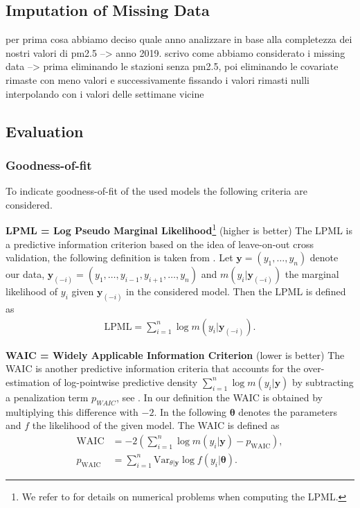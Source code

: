 \documentclass[12pt,a4paper]{article}
\begin{document}
\subsection{Imputation of Missing Data}
per prima cosa abbiamo deciso quale anno analizzare in base alla completezza dei nostri valori di pm2.5 --> anno 2019. 
scrivo come abbiamo considerato i missing data --> prima eliminando le stazioni senza pm2.5, poi eliminando le covariate rimaste con meno valori e successivamente fissando i valori rimasti nulli interpolando con i valori delle settimane vicine 

\subsection{Evaluation}

\subsubsection{Goodness-of-fit}
To indicate goodness-of-fit of the used models the following criteria are considered.

\textbf{LPML = Log Pseudo Marginal Likelihood}\footnote{We refer to
\cite[Section 4.1]{Page2021-Temporal} for details on numerical problems
when computing the LPML.} (higher is better)
The LPML is a predictive information criterion based on the idea of leave-on-out cross validation, the following definition is taken from \cite{lecturenotes}. Let $\mathbf{y} = (y_1, \dots , y_n )$ denote our data, $\mathbf{y}_{(-i)} = (y_1, \dots , y_{i-1}, y_{i+1}, \dots, y_n )$ and $m(y_i | \mathbf{y}_{(-i)}) $ the marginal likelihood of $y_i$ given $\mathbf{y}_{(-i)}$ in the considered model. Then the LPML is defined as
\begin{align*}
    \text{LPML} = \sum_{i=1}^n \log m(y_i | \mathbf{y}_{(-i)}).
\end{align*}

    
\textbf{WAIC = Widely Applicable Information Criterion} (lower is better)
The WAIC is another predictive information criteria that accounts for the over-estimation of log-pointwise predictive density $\sum_{i=1}^n \log m(y_i | \mathbf{y})$ by subtracting a penalization term $p_{WAIC}$, see \cite{lecturenotes}. In our definition the WAIC is obtained by multiplying this difference with $-2$. In the following $\mathbf{\theta}$ denotes the parameters and $f$ the likelihood of the given model. The WAIC is defined as
\begin{align*}
    \text{WAIC} &= -2 \left( \sum_{i=1}^n \log m(y_i | \mathbf{y} ) - 
    p_{\text{WAIC}} \right), \\
    p_{\text{WAIC}} &= \sum_{i=1}^n \text{Var}_{\theta | \mathbf{y}} \log 
    f(y_i | \mathbf{\theta} ).
\end{align*}
\end{document}
